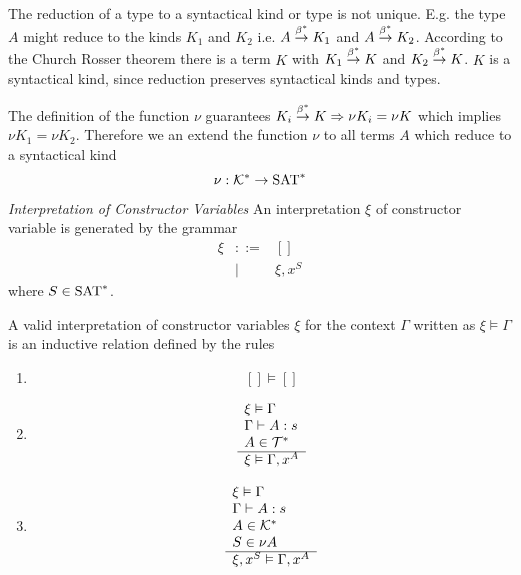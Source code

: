 The reduction of a type to a syntactical kind or type is not unique. E.g. the
type $A$ might reduce to the kinds $K_1$ and $K_2$ i.e. $A \stackrel{\beta^*}{\to} K_1$ and
$A \stackrel{\beta^*}{\to} K_2$. According to the Church Rosser theorem there is a term $K$
with $K_1 \stackrel{\beta^*}{\to} K$ and $K_2 \stackrel{\beta^*}{\to} K$. $K$ is a syntactical kind,
since reduction preserves syntactical kinds and types.

The definition of the function $\nu$ guarantees $K_i \stackrel{\beta^*}{\to} K \Rightarrow \nu K_i
= \nu K$ which implies $\nu K_1 = \nu K_2$. Therefore we an extend the function
$\nu$ to all terms $A$ which reduce to a syntactical kind
$$
\nu : {\cal K}^* \to \text{SAT}^*
$$


\begin{definition}
    \emph{Interpretation of Constructor Variables} An interpretation $\xi$ of
    constructor variable is generated by the grammar
    $$
    \begin{array}{lll}
        \xi &::=& []
        \\
        &\mid& \xi, x^S
    \end{array}
    $$
    where $S \in \text{SAT}^*$.

    A valid interpretation of constructor variables $\xi$ for the
    context $\Gamma$ written as $\xi \vDash \Gamma$ is an inductive relation
    defined by the rules
    \begin{enumerate}
    \item
        $$
            [] \vDash []
        $$

    \item
        $$
        \begin{array}{l} 
            \xi \vDash \Gamma
            \\
            \Gamma \vdash A: s
            \\
            A \in {\cal T}^*
         \\ \hline 
            \xi \vDash \Gamma, x^A
        \end{array}
        $$
    \item
        $$
        \begin{array}{l} 
            \xi \vDash \Gamma
            \\
            \Gamma \vdash A: s
            \\
            A \in {\cal K}^*
            \\
            S \in \nu A
         \\ \hline 
            \xi, x^S \vDash \Gamma, x^A
        \end{array}
        $$
    \end{enumerate}
\end{definition}


